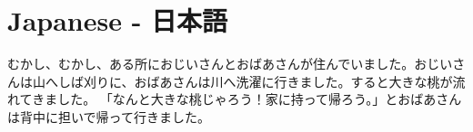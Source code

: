 \chapter{Japanese - 日本語}

むかし、むかし、ある所におじいさんとおばあさんが住んでいました。おじいさんは山へしば刈りに、おばあさんは川へ洗濯に行きました。すると大きな桃が流れてきました。
「なんと大きな桃じゃろう！家に持って帰ろう。」とおばあさんは背中に担いで帰って行きました。